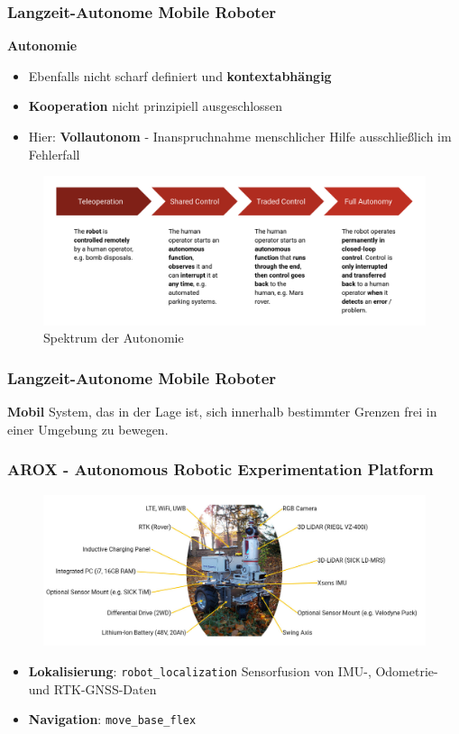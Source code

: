 \documentclass{beamer}
\newcommand{\code}[1]{\colorbox{light-gray}{\texttt{#1}}}
\begin{document}
\begin{frame}
  \frametitle{Langzeit-Autonome Mobile Roboter}
  \textbf{Autonomie}
  \begin{itemize}
    \item Ebenfalls nicht scharf definiert und \textbf{kontextabhängig}
    \item \textbf{Kooperation} nicht prinzipiell ausgeschlossen
    \item Hier: \textbf{Vollautonom} - Inanspruchnahme menschlicher Hilfe ausschließlich im Fehlerfall
  \end{itemize}
  \begin{figure}[H]
    \centering
    \includegraphics[width=\textwidth]{img/autonomy_spectrum.png}
    \caption*{Spektrum der Autonomie}
  \end{figure}
\end{frame}

\begin{frame}
  \frametitle{Langzeit-Autonome Mobile Roboter}
  \textbf{Mobil}\newline
  System, das in der Lage ist, sich innerhalb bestimmter Grenzen frei in einer Umgebung zu bewegen.
\end{frame}

\begin{frame}
  \frametitle{AROX - Autonomous Robotic Experimentation Platform}
  \begin{figure}[H]
    \centering
    \includegraphics[width=\textwidth]{img/AROX.jpg}
    \caption*{}
  \end{figure}
  \begin{itemize}
    \item \textbf{Lokalisierung}: \code{robot\_localization} \cite{Moore:2014}\newline \textrightarrow \thinspace Sensorfusion von IMU-, Odometrie- und RTK-GNSS-Daten
    \item \textbf{Navigation}: \code{move\_base\_flex} \cite{Puetz:2018}
  \end{itemize}
\end{frame}
\end{document}
